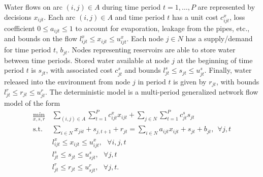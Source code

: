 \documentclass[11pt]{article}
\newcommand{\st}{\mbox{s.t.}}
\begin{document}
Water flows on arc $(i,j) \in A$ during time period $t = 1, \dots, P$ are represented by decisions $x_{ijt}$.
Each arc $(i,j) \in A$ and time period $t$ has a unit cost $c_{ijt}^x$, loss coefficient $0 \leq a_{ijt} \leq 1$ to account for evaporation, leakage from the pipes, etc., and bounds on the flow $l_{ijt}^x \leq x_{ijt} \leq u_{ijt}^x$.
Each node $j \in N$ has a supply/demand for time period $t$, $b_{jt}$.
Nodes representing reservoirs are able to store water between time periods.
Stored water available at node $j$ at the beginning of time period $t$ is $s_{jt}$, with associated cost $c_{jt}^s$ and bounds $l_{jt}^s \leq s_{jt} \leq u_{jt}^s$.
Finally, water released into the environment from node $j$ in period $t$ is given by $r_{jt}$, with bounds $l_{jt}^r \leq r_{jt} \leq u_{jt}^r$.
The deterministic model is a multi-period generalized network flow model of the form
\begin{align*}
	\min_{x,s,r} \ & \sum_{(i,j) \in A} \sum_{t=1}^P c_{ijt}^x x_{ijt} + \sum_{j \in N} \sum_{t=1}^P c_{jt}^s s_{jt}\\
	\st \ & \sum_{i \in N} x_{jit} + s_{j,t+1} + r_{jt} = \sum_{i \in N} a_{ijt} x_{ijt} + s_{jt} + b_{jt}, \ \ \forall j,t \\
	& l_{ijt}^x \leq x_{ijt} \leq u_{ijt}^x,\ \ \ \forall i,j,t \\
	& l_{jt}^s \leq s_{jt} \leq u_{sjt}^s, \ \ \ \forall j,t \\
	& l_{jt}^r \leq r_{jt} \leq u_{sjt}^r, \ \ \ \forall j,t.
\end{align*}
\end{document}
